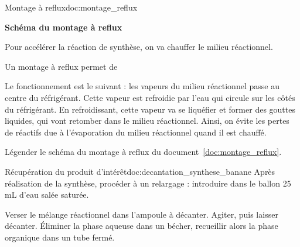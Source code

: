 \begin{doc}{Montage à reflux}{doc:montage_reflux}
  \vspace*{-24pt}
  \begin{importants}
    \begin{center}
      
      \vspace*{-8pt}
      \textbf{\small{Schéma du montage à reflux}}
    \end{center}
  \end{importants}
  Pour accélérer la réaction de synthèse, on va chauffer le milieu réactionnel.
  
  Un montage à reflux permet de 
  
  Le fonctionnement est le suivant : les vapeurs du milieu réactionnel passe au centre du réfrigérant.
  Cette vapeur est refroidie par l'eau qui circule sur les côtés du réfrigérant.
  En refroidissant, cette vapeur va se liquéfier et former des gouttes liquides, qui vont retomber dans le milieu réactionnel.
  Ainsi, on évite les pertes de réactifs due à l'évaporation du milieu réactionnel quand il est chauffé.
\end{doc}

\numeroQuestion Légender le schéma du montage à reflux du document~\ref{doc:montage_reflux}.



\begin{doc}{Récupération du produit d'intérêt}{doc:decantation_synthese_banane}
  Après réalisation de la synthèse, procéder à un relargage : introduire dans le ballon 25 mL d'eau salée saturée.
  \vspace*{-8pt}
  \begin{center}
  \end{center}
  \vspace*{-16pt}
  Verser le mélange réactionnel dans l'ampoule à décanter.
  Agiter, puis laisser décanter.
  Éliminer la phase aqueuse dans un bécher, recueillir alors la phase organique dans un tube fermé.
\end{doc}




